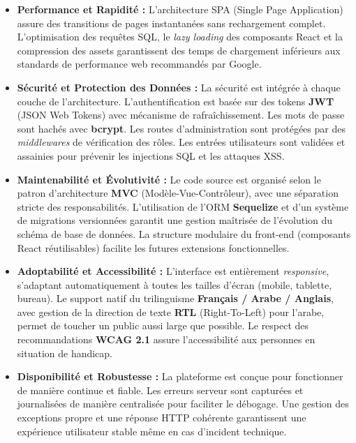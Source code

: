 \documentclass[12pt,a4paper,twoside,openright]{report}
\begin{document}
\begin{itemize}[label=\textcolor{primaryBlue}{$\bullet$}, leftmargin=1.5cm, itemsep=0.35cm]

    \item \textbf{Performance et Rapidité :}
    L'architecture SPA (Single Page Application) assure des transitions de pages instantanées sans rechargement complet. L'optimisation des requêtes SQL, le \textit{lazy loading} des composants React et la compression des assets garantissent des temps de chargement inférieurs aux standards de performance web recommandés par Google.

    \item \textbf{Sécurité et Protection des Données :}
    La sécurité est intégrée à chaque couche de l'architecture. L'authentification est basée sur des tokens \textbf{JWT} (JSON Web Tokens) avec mécanisme de rafraîchissement. Les mots de passe sont hachés avec \textbf{bcrypt}. Les routes d'administration sont protégées par des \textit{middlewares} de vérification des rôles. Les entrées utilisateurs sont validées et assainies pour prévenir les injections SQL et les attaques XSS.

    \item \textbf{Maintenabilité et Évolutivité :}
    Le code source est organisé selon le patron d'architecture \textbf{MVC} (Modèle-Vue-Contrôleur), avec une séparation stricte des responsabilités. L'utilisation de l'ORM \textbf{Sequelize} et d'un système de migrations versionnées garantit une gestion maîtrisée de l'évolution du schéma de base de données. La structure modulaire du front-end (composants React réutilisables) facilite les futures extensions fonctionnelles.

    \item \textbf{Adoptabilité et Accessibilité :}
    L'interface est entièrement \textit{responsive}, s'adaptant automatiquement à toutes les tailles d'écran (mobile, tablette, bureau). Le support natif du trilinguisme \textbf{Français / Arabe / Anglais}, avec gestion de la direction de texte \textbf{RTL} (Right-To-Left) pour l'arabe, permet de toucher un public aussi large que possible. Le respect des recommandations \textbf{WCAG 2.1} assure l'accessibilité aux personnes en situation de handicap.

    \item \textbf{Disponibilité et Robustesse :}
    La plateforme est conçue pour fonctionner de manière continue et fiable. Les erreurs serveur sont capturées et journalisées de manière centralisée pour faciliter le débogage. Une gestion des exceptions propre et une réponse HTTP cohérente garantissent une expérience utilisateur stable même en cas d'incident technique.

\end{itemize}
\end{document}
